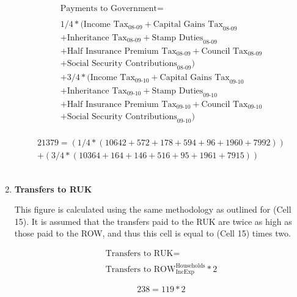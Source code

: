 \begin{enumerate}
\begin{equation}
\begin{split}
\text{Payments to Government} =  \\ \\
1/4*(\text{Income Tax}_\text{08-09}+\text{Capital Gains Tax}_\text{08-09}\\
+\text{Inheritance Tax}_\text{08-09}+\text{Stamp Duties}_\text{08-09}\\
+\text{Half Insurance Premium Tax}_\text{08-09}+\text{Council Tax}_\text{08-09}\\
+\text{Social Security Contributions}_\text{08-09})\\
+3/4*(\text{Income Tax}_\text{09-10}+\text{Capital Gains Tax}_\text{09-10}\\
+\text{Inheritance Tax}_\text{09-10}+\text{Stamp Duties}_\text{09-10}\\
+\text{Half Insurance Premium Tax}_\text{09-10}+\text{Council Tax}_\text{09-10}\\
+\text{Social Security Contributions}_\text{09-10})\\
\end{split} \label{eq:2.5.17}
\end{equation}

\begin{equation} \nonumber
\begin{split}
21379=(1/4*(10642+572+178+594+96+1960+7992))\\
+(3/4*(10364+164+146+516+95+1961+7915))
\end{split}
\end{equation}\\


\item \textbf {Transfers to RUK}

This figure is calculated using the same methodology as outlined for (Cell 15). It is assumed that the transfers paid to the RUK are twice as high as those paid to the ROW, and thus this cell is equal to (Cell 15) times two.

\begin{equation}
\begin{split}
\text{Transfers to RUK} =  \\ \\
\text{Transfers to ROW}^\text{Households}_\text{IncExp}*2
\end{split} \label{eq:2.5.18}
\end{equation}

\begin{equation} \nonumber
238 = 119*2
\end{equation}\\


\end{enumerate}
